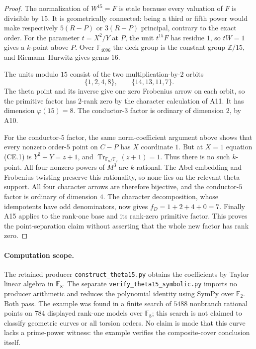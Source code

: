 \documentclass[11pt,a4paper]{article}
\begin{document}
\begin{proof}
The normalization of $W^{15}=F$ is etale because every valuation
of $F$ is divisible by $15$. It is geometrically connected:
being a third or fifth power would make respectively
$5(R-P)$ or $3(R-P)$ principal, contrary to the exact order.
For the parameter $t=X^2/Y$ at $P$, the unit $t^{15}F$ has residue
$1$, so $tW=1$ gives a $k$-point above $P$. Over
$\mathbb F_{4096}$ the deck group is the constant group
$\mathbb Z/15$, and Riemann--Hurwitz gives genus $16$.

The units modulo $15$ consist of the two multiplication-by-$2$
orbits
\[
                \{1,2,4,8\},\qquad\{14,13,11,7\}.
\]
The theta point and its inverse give one zero Frobenius arrow on
each orbit, so the primitive factor has $2$-rank zero by the
character calculation of A11. It has dimension $\varphi(15)=8$.
The conductor-$3$ factor is ordinary of dimension $2$, by A10.

For the conductor-$5$ factor, the same norm-coefficient argument
above shows that every nonzero order-$5$ point on $C-P$ has
$X$ coordinate $1$. But at $X=1$ equation (CE.1) is
$Y^2+Y=z+1$, and $\operatorname{Tr}_{\mathbb F_8/\mathbb F_2}(z+1)=1$.
Thus there is no such $k$-point. All four nonzero powers of
$M^3$ are $k$-rational. The Abel embedding and Frobenius twisting
preserve this rationality, so none lies on the relevant theta
support. All four character arrows are therefore bijective, and
the conductor-$5$ factor is ordinary of dimension $4$.
The character decomposition, whose idempotents have odd
denominators, now gives
$f_D=1+2+4+0=7$. Finally A15 applies to the rank-one base and its
rank-zero primitive factor. This proves the point-separation claim
without asserting that the whole new factor has rank zero.
\end{proof}

\paragraph{Computation scope.}
The retained producer \texttt{construct\_theta15.py} obtains the
coefficients by Taylor linear algebra in $\mathbb F_8$.
The separate \texttt{verify\_theta15\_symbolic.py} imports no
producer arithmetic and reduces the polynomial identity using
SymPy over $\mathbb F_2$. Both pass. The example was found in a
finite search of $5488$ nonbranch rational points on $784$
displayed rank-one models over $\mathbb F_8$; this search is not
claimed to classify geometric curves or all torsion orders.
No claim is made that this curve lacks a prime-power witness:
the example verifies the composite-cover conclusion itself.
\end{document}

